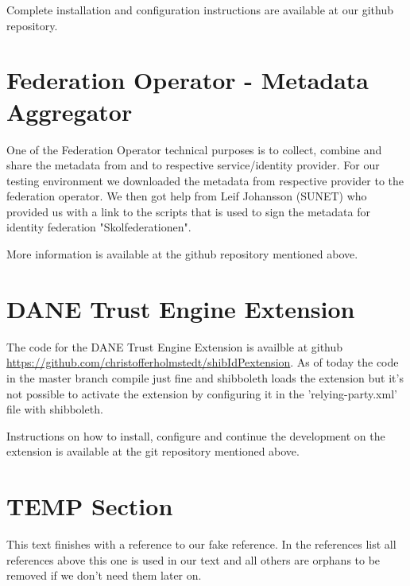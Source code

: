 Complete installation and configuration instructions are available at our github repository.

\section{Federation Operator - Metadata Aggregator}
One of the Federation Operator technical purposes is to collect, combine and share the metadata from and to respective service/identity provider.
For our testing environment we downloaded the metadata from respective provider to the federation operator.
We then got help from Leif Johansson (SUNET) who provided us with a link to the scripts that is used to sign the metadata for identity federation "Skolfederationen".

More information is available at the github repository mentioned above.

\section{DANE Trust Engine Extension}
The code for the DANE Trust Engine Extension is availble at github \url{https://github.com/christofferholmstedt/shibIdPextension}.
As of today the code in the master branch compile just fine and shibboleth loads the extension but it's not possible to activate the extension by configuring it in the 'relying-party.xml' file with shibboleth.

Instructions on how to install, configure and continue the development on the extension is available at the git repository mentioned above.

\section{TEMP Section}
This text finishes with a reference to our fake reference.
In the references list all references above this one is used in our text and all others are orphans to be removed if we don't need them later on.\cite{fake}
\nocite{*}
